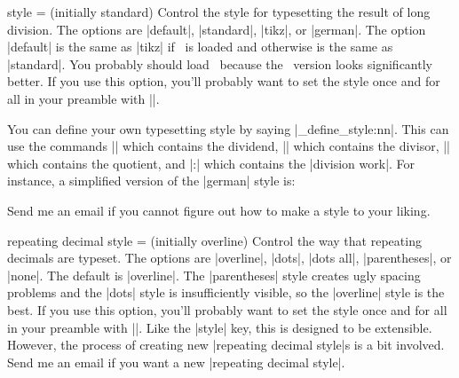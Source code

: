 \documentclass{ltxdoc}
\begin{document}
\begin{key}{style =  (initially standard)}
Control the style for typesetting the result of long division. The options are |default|, |standard|, |tikz|, or |german|. The option |default| is the same as |tikz| if \tikzname\ is loaded and otherwise is the same as |standard|. You probably should load \tikzname\ because the \tikzname\ version looks significantly better. If you use this option, you'll probably want to set the style once and for all in your preamble with ||.
\begin{tcblisting}{}
 \quad
{} \quad
{}
\end{tcblisting}
You can define your own typesetting style by saying |\longdiv_define_style:nn|. This can use the commands |\longdivdividend| which contains the dividend, |\longdivdivisor| which contains the divisor, |\longdivquotient| which contains the quotient, and |\longdivwork:| which contains the |division work|.  For instance, a simplified version of the |german| style is:
\begin{tcblisting}{}
\end{tcblisting}
Send me an email if you cannot figure out how to make a style to your liking.
\end{key}

\begin{key}{repeating decimal style =  (initially overline)}
Control the way that repeating decimals are typeset. The options are |overline|, |dots|, |dots all|, |parentheses|, or |none|. The default is |overline|. The |parentheses| style creates ugly spacing problems and the |dots| style is insufficiently visible, so the |overline| style is the best. If you use this option, you'll probably want to set the style once and for all in your preamble with ||. Like the |style| key, this is designed to be extensible. However, the process of creating new |repeating decimal style|s is a bit involved. Send me an email if you want a new |repeating decimal style|.
\begin{tcblisting}{}
 \quad
{} \quad
{} \quad
{} \quad
{}
\end{tcblisting}
\end{key}
\end{document}
